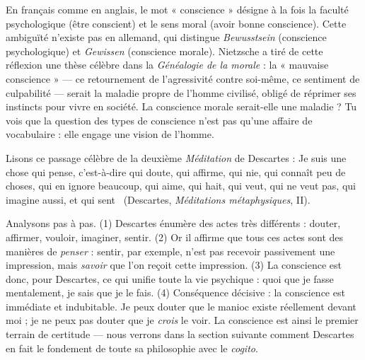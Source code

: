 \documentclass[11pt]{article}
\begin{document}
\begin{savaistu}
En français comme en anglais, le mot « conscience » désigne à la fois la faculté psychologique (être conscient) et le sens moral (avoir bonne conscience). Cette ambiguïté n'existe pas en allemand, qui distingue \emph{Bewusstsein} (conscience psychologique) et \emph{Gewissen} (conscience morale). Nietzsche a tiré de cette réflexion une thèse célèbre dans la \emph{Généalogie de la morale} : la « mauvaise conscience » — ce retournement de l'agressivité contre soi-même, ce sentiment de culpabilité — serait la maladie propre de l'homme civilisé, obligé de réprimer ses instincts pour vivre en société. La conscience morale serait-elle une maladie ? Tu vois que la question des types de conscience n'est pas qu'une affaire de vocabulaire : elle engage une vision de l'homme.
\end{savaistu}

\begin{experience}
Lisons ce passage célèbre de la deuxième \emph{Méditation} de Descartes : \guillemotleft Je suis une chose qui pense, c'est-à-dire qui doute, qui affirme, qui nie, qui connaît peu de choses, qui en ignore beaucoup, qui aime, qui hait, qui veut, qui ne veut pas, qui imagine aussi, et qui sent \guillemotright\ (Descartes, \emph{Méditations métaphysiques}, II).

Analysons pas à pas. (1) Descartes énumère des actes très différents : douter, affirmer, vouloir, imaginer, sentir. (2) Or il affirme que tous ces actes sont des manières de \emph{penser} : sentir, par exemple, n'est pas recevoir passivement une impression, mais \emph{savoir} que l'on reçoit cette impression. (3) La conscience est donc, pour Descartes, ce qui unifie toute la vie psychique : quoi que je fasse mentalement, je sais que je le fais. (4) Conséquence décisive : la conscience est immédiate et indubitable. Je peux douter que le manioc existe réellement devant moi ; je ne peux pas douter que je \emph{crois} le voir. La conscience est ainsi le premier terrain de certitude — nous verrons dans la section suivante comment Descartes en fait le fondement de toute sa philosophie avec le \emph{cogito}.
\end{experience}
\end{document}

